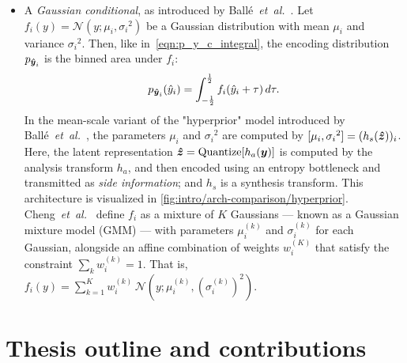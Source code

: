 \begin{itemize}
  \item
    A \emph{Gaussian conditional}, as introduced by Ballé~\emph{et~al.}~\cite{balle2018variational}.
    Let $f_i(y) = \mathcal{N}(y; {\mu_i}, {\sigma_i}^2)$ be a Gaussian distribution with mean ${\mu_i}$ and variance ${\sigma_i}^2$.
    Then, like in~\cref{eqn:p_y_c_integral}, the encoding distribution $p_{{\boldsymbol{\hat{y}}}_i}$ is the binned area under $f_i$:
    \begin{equation}
      \label{eqn:p_y_i_integral}
      p_{{\boldsymbol{\hat{y}}}_i}(\hat{y}_i)
      = \int_{-\frac{1}{2}}^{\frac{1}{2}} f_i(\hat{y}_i + \tau) \, d\tau.
    \end{equation}
    In the mean-scale variant of the "hyperprior" model introduced by Ballé~\emph{et~al.}~\cite{balle2018variational},
    the parameters ${\mu_i}$ and ${\sigma_i}^2$ are computed by
    $[{\mu_i}, {\sigma_i}^2] = (h_s({\boldsymbol{\hat{z}}}))_i$.
    Here, the latent representation ${\boldsymbol{\hat{z}}} = \operatorname{Quantize}[h_a({\boldsymbol{y}})]$ is computed by the analysis transform $h_a$, and then encoded using an entropy bottleneck and transmitted as \emph{side information};
    and $h_s$ is a synthesis transform.
    This architecture is visualized in \cref{fig:intro/arch-comparison/hyperprior}.
    Cheng~\emph{et~al.}~\cite{cheng2020learned} define $f_i$ as a mixture of $K$ Gaussians --- known as a Gaussian mixture model (GMM) --- with parameters ${\mu}_{i}^{(k)}$ and ${\sigma}_{i}^{(k)}$ for each Gaussian, alongside an affine combination of weights ${w}_{i}^{(K)}$ that satisfy the constraint $\sum_k {w}_{i}^{(k)} = 1$.
    That is,
    $f_i(y) = \sum_{k=1}^{K} {w}_{i}^{(k)} \, \mathcal{N}(y; {\mu}_{i}^{(k)}, ({\sigma}_{i}^{(k)})^2)$.
\end{itemize}




\section{Thesis outline and contributions}

